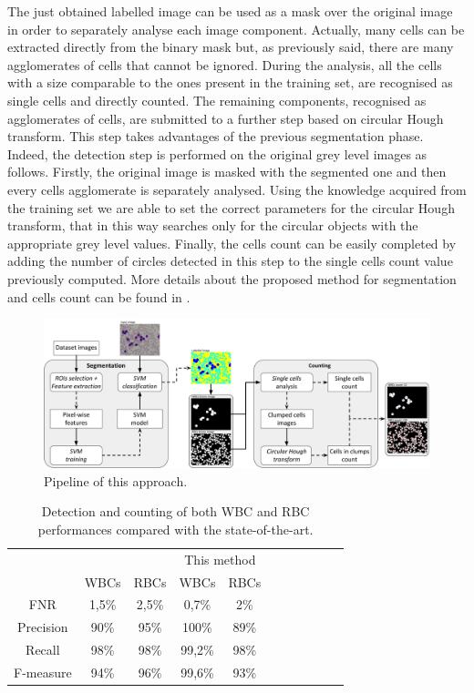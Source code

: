 \documentclass[final,a4paper,12pt,english]{UnicaPhdThesis3}
\begin{document}
The just obtained labelled image can be used as a mask over the original image in order to separately analyse each image component. Actually, many cells can be extracted directly from the binary mask but, as previously said, there are many agglomerates of cells that cannot be ignored. During the analysis, all the cells with a size comparable to the ones present in the training set, are recognised as single cells and directly counted. The remaining components, recognised as agglomerates of cells, are submitted to a further step based on circular Hough transform. This step takes advantages of the previous segmentation phase. Indeed, the detection step is performed on the original grey level images as follows. Firstly, the original image is masked with the segmented one and then every cells agglomerate is separately analysed. Using the knowledge acquired from the training set we are able to set the correct parameters for the circular Hough transform, that in this way searches only for the circular objects with the appropriate grey level values. Finally, the cells count can be easily completed by adding the number of circles detected in this step to the single cells count value previously computed. More details about the proposed method for segmentation and cells count can be found in \cite{DiRuberto2016}.

\begin{figure}[!t]
	\centering
	\includegraphics[height=0.39\textwidth]{images/2016_2_sitis/Schema}
	\caption{\label{fig:Schema}Pipeline of this approach.}
\end{figure}

\begin{table}[!t]
	\centering\tabcolsep=1mm
	\begin{tabular}{ccccccccccc}
		\hline
		&\multicolumn{2}{c}{\cite{Alomari}} 	&\multicolumn{2}{c}{This method}\\
		& 	WBCs 		& RBCs 						&	WBCs 		& 	RBCs \\
		\hline
		FNR			&	1,5\% 		&  2,5\%					&	0,7\% 		&  2\%\\
		Precision &	90\% 		&  95\% 					&	100\% 		&  89\%\\
		Recall		& 	98\% 		&  98\% 					&	 99,2\% 	&  98\%\\
		F-measure 	& 	94\% 		&  96\%						&	 99,6\% 	&  93\%\\
		\hline
	\end{tabular} 
	\label{tab:table2}
	\caption{Detection and counting of both WBC and RBC performances compared with the state-of-the-art.}
\end{table}
\end{document}
